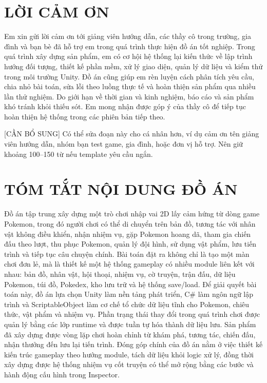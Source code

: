 
\chapter*{LỜI CẢM ƠN}

Em xin gửi lời cảm ơn tới giảng viên hướng dẫn, các thầy cô trong trường, gia đình và bạn bè đã hỗ trợ em trong quá trình thực hiện đồ án tốt nghiệp. Trong quá trình xây dựng sản phẩm, em có cơ hội hệ thống lại kiến thức về lập trình hướng đối tượng, thiết kế phần mềm, xử lý giao diện, quản lý dữ liệu và kiểm thử trong môi trường Unity. Đồ án cũng giúp em rèn luyện cách phân tích yêu cầu, chia nhỏ bài toán, sửa lỗi theo luồng thực tế và hoàn thiện sản phẩm qua nhiều lần thử nghiệm. Do giới hạn về thời gian và kinh nghiệm, báo cáo và sản phẩm khó tránh khỏi thiếu sót. Em mong nhận được góp ý của thầy cô để tiếp tục hoàn thiện hệ thống trong các phiên bản tiếp theo.

[CẦN BỔ SUNG] Có thể sửa đoạn này cho cá nhân hơn, ví dụ cảm ơn tên giảng viên hướng dẫn, nhóm bạn test game, gia đình, hoặc đơn vị hỗ trợ. Nên giữ khoảng 100--150 từ nếu template yêu cầu ngắn.

\chapter*{TÓM TẮT NỘI DUNG ĐỒ ÁN}

Đồ án tập trung xây dựng một trò chơi nhập vai 2D lấy cảm hứng từ dòng game Pokemon, trong đó người chơi có thể di chuyển trên bản đồ, tương tác với nhân vật không điều khiển, nhận nhiệm vụ, gặp Pokemon hoang dã, tham gia chiến đấu theo lượt, thu phục Pokemon, quản lý đội hình, sử dụng vật phẩm, lưu tiến trình và tiếp tục câu chuyện chính. Bài toán đặt ra không chỉ là tạo một màn chơi đơn lẻ, mà là thiết kế một hệ thống gameplay có nhiều module liên kết với nhau: bản đồ, nhân vật, hội thoại, nhiệm vụ, cờ truyện, trận đấu, dữ liệu Pokemon, túi đồ, Pokedex, kho lưu trữ và hệ thống save/load. Để giải quyết bài toán này, đồ án lựa chọn Unity làm nền tảng phát triển, C\# làm ngôn ngữ lập trình và ScriptableObject làm cơ chế tổ chức dữ liệu tĩnh cho Pokemon, chiêu thức, vật phẩm và nhiệm vụ. Phần trạng thái thay đổi trong quá trình chơi được quản lý bằng các lớp runtime và được tuần tự hóa thành dữ liệu lưu. Sản phẩm đã xây dựng được vòng lặp chơi hoàn chỉnh từ khám phá, tương tác, chiến đấu, nhận thưởng đến lưu lại tiến trình. Đóng góp chính của đồ án nằm ở việc thiết kế kiến trúc gameplay theo hướng module, tách dữ liệu khỏi logic xử lý, đồng thời xây dựng được hệ thống nhiệm vụ cốt truyện có thể mở rộng bằng các bước và hành động cấu hình trong Inspector.

